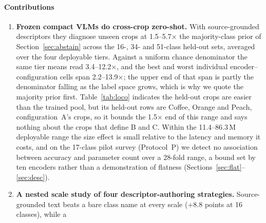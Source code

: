 \documentclass[a4paper,fleqn]{cas-dc}
\begin{document}
\paragraph{Contributions}
\begin{enumerate}
\item \textbf{Frozen compact VLMs do cross-crop zero-shot.} With source-grounded descriptors they
diagnose unseen crops at 1.5--5.7$\times$ the majority-class prior of Section~\ref{sec:abstain}
across the 16-, 34- and 51-class held-out sets, averaged over the four deployable tiers. Against a
uniform chance denominator the same tier means read 3.4--12.2$\times$, and the best and worst
individual encoder--configuration cells span 2.2--13.9$\times$; the upper end of that span is
partly the denominator falling as the label space grows, which is why we quote the majority prior
first. Table~\ref{tab:loco} indicates the held-out crops are easier than the trained pool, but its held-out rows are Coffee, Orange and Peach, configuration~A's crops, so it bounds the 1.5$\times$ end of this range and says nothing about the crops that define B and C. Within the 11.4--86.3\,M deployable range the size effect is small relative to the latency and memory it costs, and on the 17-class pilot survey (Protocol~P) we detect no association between accuracy and parameter count over a 28-fold range, a bound set by ten encoders rather than a demonstration of flatness (Sections~\ref{sec:flat}--\ref{sec:desc}).
\item \textbf{A nested scale study of four descriptor-authoring strategies.}
Source-grounded text beats a bare class name at every scale (+8.8 points at 16 classes), while a

\end{enumerate}
\end{document}
